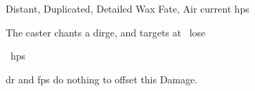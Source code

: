   {Distant, Duplicated, Detailed}%
  {Wax}%
  {Fate, Air}%
  {current \glspl{hp}}%
  {The caster chants a dirge, and  targets at \spellRange\ lose \addtocounter{damagebonus}{-1}\showDam~\glspl{hp}}%
  {\Gls{dr} and \glspl{fp} do nothing to offset this Damage.}
